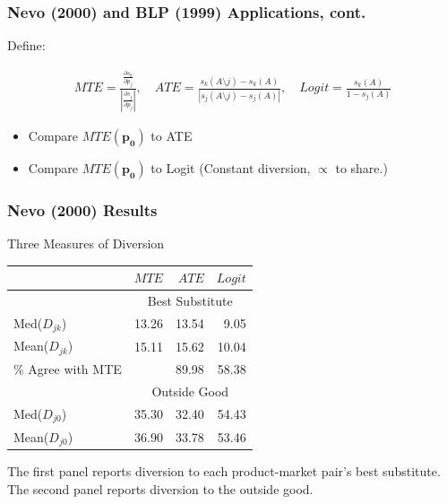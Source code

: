 \documentclass[xcolor=pdftex,dvipsnames,table,mathserif,aspectratio=169]{beamer}
\begin{document}
\begin{frame}
\frametitle{Nevo (2000) and BLP (1999) Applications, cont.}
Define:

\begin{eqnarray*}
MTE = \frac{ \frac{\partial s_k}{\partial p_j}}{\left|\frac{\partial s_j}{\partial p_j}\right|},\quad  
ATE = \frac{s_k(A \setminus j) - s_k(A)}{\left| s_j(A \setminus j)- s_j(A ) \right|}, \quad
Logit = \frac{s_k(A)}{1-s_j(A)} 
\end{eqnarray*}
\begin{itemize}
\item Compare $MTE(\mathbf{p_0})$ to ATE
\item Compare $MTE(\mathbf{p_0})$ to Logit (Constant diversion, $\propto$ to share.)
\end{itemize}


\end{frame}

\begin{frame}
\frametitle{Nevo (2000) Results}
Three Measures of Diversion
\begin{center}
\begin{tabular}{lrrr}
{} &  $MTE$  &  $ATE$ &  $Logit$  \\ \hline
& \multicolumn{3}{c}{Best Substitute}\\ \hline
Med($D_{jk}$)  &    13.26  &  13.54 &     9.05 \\
Mean($D_{jk}$) &    15.11  &  15.62 &    10.04 \\
\% Agree with MTE     &   &  89.98 &    58.38 \\ \hline
& \multicolumn{3}{c}{Outside Good}\\ \hline
Med($D_{j0}$)  &    35.30  &  32.40 &    54.43 \\
Mean($D_{j0}$) &    36.90 &  33.78 &    53.46 \\ \hline
\end{tabular}
\end{center}
The first panel reports diversion to each product-market pair's best substitute. The second panel reports diversion to the outside good.
\end{frame}
\end{document}
